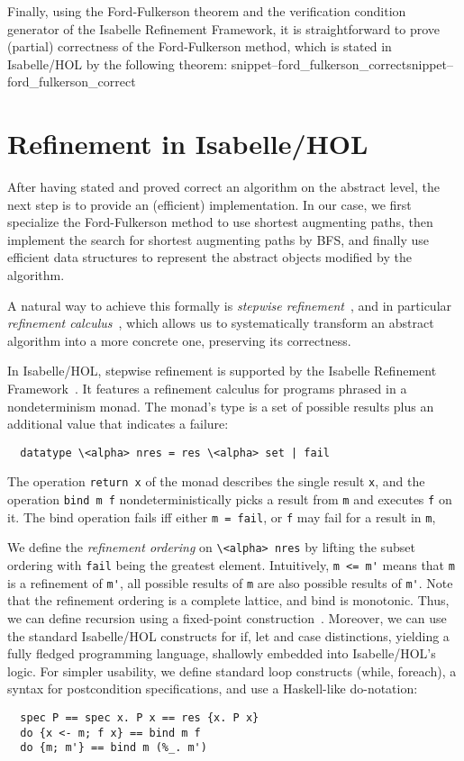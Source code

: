 \documentclass{llncs}
\newcommand{\isai}{\lstinline[language=isabelle,basicstyle=\normalsize\ttfamily\slshape]}
\newcommand{\Snippet}[1]{\ifcsname snippet--#1\endcsname\csname snippet--#1\endcsname\else\PackageError{}{No snippet '#1' defined.}{}\fi}
\begin{document}

Finally, using the Ford-Fulkerson theorem and the verification condition generator of the Isabelle Refinement Framework, it is straightforward to prove (partial) correctness of
the Ford-Fulkerson method, which is stated in Isabelle/HOL by the following theorem:
\Snippet{ford_fulkerson_correct}

\section{Refinement in Isabelle/HOL}\label{sec:refinement}
After having stated and proved correct an algorithm on the abstract level, the next step is to provide an (efficient) implementation. 
In our case, we first specialize the Ford-Fulkerson method to use shortest augmenting paths, then implement the search for shortest augmenting paths by BFS, and finally use efficient data structures to represent the abstract objects modified by the algorithm. 

A natural way to achieve this formally is \emph{stepwise refinement}~\cite{Wirth71}, and in particular \emph{refinement calculus}~\cite{Back78,BaWr98}, which allows us to systematically transform an abstract algorithm into a more concrete one, preserving its correctness.

In Isabelle/HOL, stepwise refinement is supported by the Isabelle Refinement Framework~\cite{LaTu12,La12}. 
It features a refinement calculus for programs phrased in a nondeterminism monad. 
The monad's type is a set of possible results plus an additional value that indicates a failure:
\begin{lstlisting}
  datatype \<alpha> nres = res \<alpha> set | fail
\end{lstlisting}
The operation \isai{return x} of the monad describes the single result \isai{x}, and the 
operation \isai{bind m f} nondeterministically picks a result from \isai{m} and executes \isai{f} on it. 
The bind operation fails iff either \isai{m = fail}, or \isai{f} may fail for a result in \isai{m}, 

We define the \emph{refinement ordering} on \isai{\<alpha> nres} by lifting the subset ordering with \isai{fail} being the greatest element.
Intuitively, \isai{m <= m'} means that \isai{m} is a refinement of \isai{m'}, \ie all possible results of \isai{m} are 
also possible results of \isai{m'}. 
Note that the refinement ordering is a complete lattice, and bind is monotonic. Thus, we can define recursion using a fixed-point construction~\cite{Kr10}.
Moreover, we can use the standard Isabelle/HOL constructs for if, let and case distinctions, yielding a fully fledged programming 
language, shallowly embedded into Isabelle/HOL's logic. For simpler usability, we define standard loop constructs (while, foreach), 
a syntax for postcondition specifications, and use a Haskell-like do-notation:
\begin{lstlisting}
  spec P == spec x. P x == res {x. P x}
  do {x <- m; f x} == bind m f
  do {m; m'} == bind m (%_. m')
\end{lstlisting}
\end{document}
